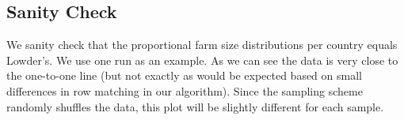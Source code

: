 \documentclass{article}
\begin{document}
\begin{Schunk}
\begin{Sinput}
> # i = 1
> for (i in 1:100) {  # use for full run
+ # for (i in 1:2) {      # use for test run
+   dat1 <- steps_1_6(df_lwd)
+   dat2 <- step_7(dat1)
+   dat3 <- step_8(dat2)
+   rast <- step_9(dat3)
+   step_10(rast, i)
+ }
\end{Sinput}
\end{Schunk}


\subsection{Sanity Check}

We sanity check that the proportional farm size distributions per country equals Lowder’s. We use one run as an example. As we can see the data is very close to the one-to-one line (but not exactly as would be expected based on small differences in row matching in our algorithm). Since the sampling scheme randomly shuffles the data, this plot will be slightly different for each sample.
\end{document}

